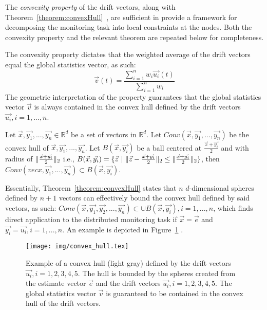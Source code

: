 The \emph{convexity property} of the drift vectors, along with Theorem~\ref{theorem:convexHull}~\cite{Sharfman2006GM}, are sufficient in provide a framework for decomposing the monitoring task into local constraints at the nodes. Both the convexity property and the relevant theorem are repeated below for completeness.
	
The convexity property dictates that the weighted average of the drift vectors equal the global statistics vector, as such:
\begin{equation}
\vec{v}(t)=\frac{\sum_{i=1}^n {w_i\vec{u_i}(t)}}{\sum_{i=1}^n {w_i}}
\label{form:convexityProperty}
\end{equation}
The geometric interpretation of the property guarantees that the global statistics vector $\vec{v}$ is always contained in the convex hull defined by the drift vectors $\vec{u_i}, i=1,...,n$.


\begin{theorem}\label{theorem:convexHull}
Let $\vec{x}, \vec{y_1}, ..., \vec{y_n} \in \mathbb{R}^d$ be a set of vectors in $\mathbb{R}^d$. Let $Conv(\vec{x}, \vec{y_1}, ..., \vec{y_n})$ be the convex hull of $\vec{x}, \vec{y_1}, ..., \vec{y_n}$. Let $B(\vec{x}, \vec{y_i})$ be a ball centered at $\frac{\vec{x}+\vec{y_i}}{2}$ and with radius of $\lVert\frac{\vec{x}+\vec{y_i}}{2}\rVert_2$ i.e., $B(\vec{x}, \vec{y_i})=\{\vec{z}\ |\ \norm{\vec{z}-\frac{\vec{x}+\vec{y_i}}{2}}_2 \leq \norm{\frac{\vec{x}+\vec{y_i}}{2}}_2 \}$, then $Conv(vec{x}, \vec{y_1}, ..., \vec{y_n}) \subset B(\vec{x}, \vec{y_i})$.
\end{theorem}

Essentially, Theorem~\ref{theorem:convexHull} states that $n$ $d$-dimensional spheres defined by $n+1$ vectors can effectively bound the convex hull defined by said vectors, as such: $Conv(\vec{x}, \vec{y_1}, \vec{y_2}, ..., \vec{y_n}) \subset  \cup B(\vec{x}, \vec{y_i}), i=1,...,n$, which finds direct application to the distributed monitoring task if $\vec{x}=\vec{e}$ and $\vec{y_i}=\vec{u_i}, i=1,...,n$. An example is depicted in Figure~\ref{fig:convexHull}
.


\begin{figure}[H]
\centering
\texttt{[image: img/convex\_hull.tex]}
\caption{Example of a convex hull (light gray) defined by the drift vectors $\vec{u_i}, i=1,2,3,4,5$. The hull is bounded by the spheres created from the estimate vector $\vec{e}$ and the drift vectors $\vec{u_i}, i=1,2,3,4,5$. The global statistics vector $\vec{v}$ is guaranteed to be contained in the convex hull of the drift vectors.} 
\label{fig:convexHull}
\end{figure}

